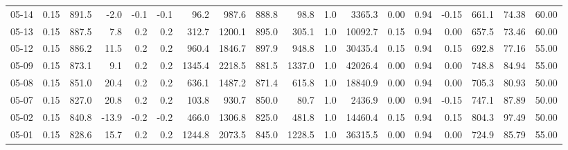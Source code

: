 \begin{threeparttable}
{\begin{tabular}{lrrrrrrrrrrrrrrrrr}
  05-14 &     0.15 & 891.5 &              -2.0 &              -0.1 &               -0.1 &               96.2 &   987.6 & 888.8 &       98.8 &                      1.0 &              3365.3 &       0.00 &      0.94 &          -0.15 &            661.1 &           74.38 &                  60.00 \\
  05-13 &     0.15 & 887.5 &               7.8 &               0.2 &                0.2 &              312.7 &  1200.1 & 895.0 &      305.1 &                      1.0 &             10092.7 &       0.15 &      0.94 &           0.00 &            657.5 &           73.46 &                  60.00 \\
  05-12 &     0.15 & 886.2 &              11.5 &               0.2 &                0.2 &              960.4 &  1846.7 & 897.9 &      948.8 &                      1.0 &             30435.4 &       0.15 &      0.94 &           0.15 &            692.8 &           77.16 &                  55.00 \\
  05-09 &     0.15 & 873.1 &               9.1 &               0.2 &                0.2 &             1345.4 &  2218.5 & 881.5 &     1337.0 &                      1.0 &             42026.4 &       0.00 &      0.94 &           0.00 &            748.8 &           84.94 &                  55.00 \\
  05-08 &     0.15 & 851.0 &              20.4 &               0.2 &                0.2 &              636.1 &  1487.2 & 871.4 &      615.8 &                      1.0 &             18840.9 &       0.00 &      0.94 &           0.00 &            705.3 &           80.93 &                  50.00 \\
  05-07 &     0.15 & 827.0 &              20.8 &               0.2 &                0.2 &              103.8 &   930.7 & 850.0 &       80.7 &                      1.0 &              2436.9 &       0.00 &      0.94 &          -0.15 &            747.1 &           87.89 &                  50.00 \\
  05-02 &     0.15 & 840.8 &             -13.9 &              -0.2 &               -0.2 &              466.0 &  1306.8 & 825.0 &      481.8 &                      1.0 &             14460.4 &       0.15 &      0.94 &           0.15 &            804.3 &           97.49 &                  50.00 \\
  05-01 &     0.15 & 828.6 &              15.7 &               0.2 &                0.2 &             1244.8 &  2073.5 & 845.0 &     1228.5 &                      1.0 &             36315.5 &       0.00 &      0.94 &           0.00 &            724.9 &           85.79 &                  55.00 \\

\end{tabular}}
\end{threeparttable}
